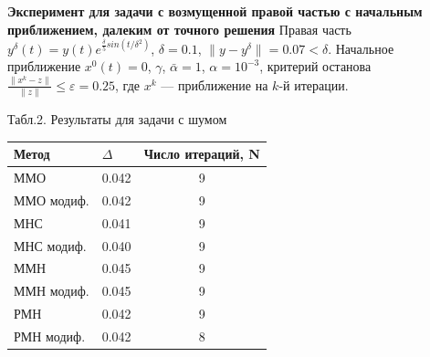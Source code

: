 \documentclass[10pt,pdf, mathserif, hyperref={unicode}]{beamer}
\begin{document}
\begin{frame}{\small\textbf{Эксперимент для задачи с возмущенной правой частью с начальным приближением, далеким от точного решения}}
	Правая часть $y^\delta(t)=y(t)e^{\frac{\delta}{5} sin(t/{\delta}^2)}$, $\delta=0.1$, $\|y-y^{\delta}\|=0.07<\delta$. Начальное приближение $x^0(t)=0$, $\gamma$, $\bar\alpha=1$, $\alpha=10^{-3}$, критерий останова $\frac{\|x^k-z\|}{\|z\|}\le\varepsilon=0.25$, где $x^k$ --- приближение на $k$-й итерации. 
	\begin{table}[H]
		\centering
		{\scriptsize Табл.2. Результаты для задачи с шумом}
		\begin{tabular}{|l|c|c|}
			\hline
			\textbf{Метод}                   & \multicolumn{1}{l|}{\textbf{$\Delta$}} & \multicolumn{1}{l|}{\textbf{Число итераций, N}} \\ \hline
			ММО                              & 0.042                                  & 9                                               \\ \hline
			\multicolumn{1}{|r|}{ММО модиф.} & 0.042                                  & 9                                               \\ \hline
			МНС                              & 0.041                                  & 9                                               \\ \hline
			МНС модиф.                       & 0.040                                  & 9                                               \\ \hline
			ММН                              & 0.045                                  & 9                                               \\ \hline
			ММН модиф.                       & 0.045                                  & 9                                               \\ \hline
			РМН                              & 0.042                                  & 9                                               \\ \hline
			РМН модиф.                       & 0.042                                  & 8                                               \\ \hline
		\end{tabular}
	\end{table}
\end{frame}
\end{document}
